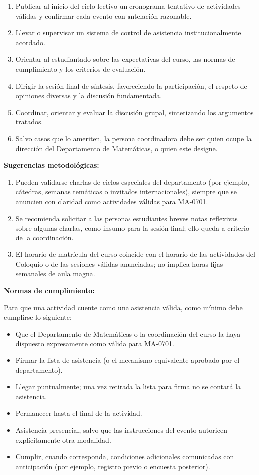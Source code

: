 \begin{refsection}
\begin{enumerate}
    \item Publicar al inicio del ciclo lectivo un cronograma tentativo de actividades válidas y confirmar cada evento con antelación razonable.
    \item Llevar o supervisar un sistema de control de asistencia institucionalmente acordado.
    \item Orientar al estudiantado sobre las expectativas del curso, las normas de cumplimiento y los criterios de evaluación.
    \item Dirigir la sesión final de síntesis, favoreciendo la participación, el respeto de opiniones diversas y la discusión fundamentada.
    \item Coordinar, orientar y evaluar la discusión grupal, sintetizando los argumentos tratados.
    \item Salvo casos que lo ameriten, la persona coordinadora debe ser quien ocupe la dirección del Departamento de Matemáticas, o quien este designe.
\end{enumerate}

\textbf{Sugerencias metodológicas:}

\begin{enumerate}

    \item Pueden validarse charlas de ciclos especiales del departamento (por ejemplo, cátedras, semanas temáticas o invitados internacionales), siempre que se anuncien con claridad como actividades válidas para MA-0701.
    \item Se recomienda solicitar a las personas estudiantes breves notas reflexivas sobre algunas charlas, como insumo para la sesión final; ello queda a criterio de la coordinación.
    \item El horario de matrícula del curso coincide con el horario de las actividades del Coloquio o de las sesiones válidas anunciadas; no implica horas fijas semanales de aula magna.
\end{enumerate}

\noindent\textbf{Normas de cumplimiento:}

Para que una actividad cuente como una asistencia válida, como mínimo debe cumplirse lo siguiente:

\begin{itemize}
\item Que el Departamento de Matemáticas o la coordinación del curso la haya dispuesto expresamente como válida para MA-0701.
\item Firmar la lista de asistencia (o el mecanismo equivalente aprobado por el departamento).
\item Llegar puntualmente; una vez retirada la lista para firma no se contará la asistencia.
\item Permanecer hasta el final de la actividad.
\item Asistencia presencial, salvo que las instrucciones del evento autoricen explícitamente otra modalidad.
\item Cumplir, cuando corresponda, condiciones adicionales comunicadas con anticipación (por ejemplo, registro previo o encuesta posterior).
\end{itemize}


\end{refsection}
